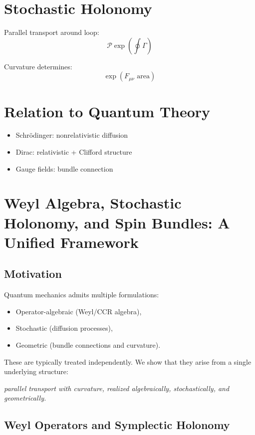 \documentclass[11pt]{article}
\begin{document}
\section{Stochastic Holonomy}

Parallel transport around loop:
\[
\mathcal{P} \exp\left( \oint \Gamma \right)
\]

Curvature determines:
\[
\exp(F_{\mu\nu} \text{ area})
\]

\section{Relation to Quantum Theory}

\begin{itemize}
\item Schr\"odinger: nonrelativistic diffusion
\item Dirac: relativistic + Clifford structure
\item Gauge fields: bundle connection
\end{itemize}


\section{Weyl Algebra, Stochastic Holonomy, and Spin Bundles: A Unified Framework}

\subsection{Motivation}

Quantum mechanics admits multiple formulations:
\begin{itemize}
\item Operator-algebraic (Weyl/CCR algebra),
\item Stochastic (diffusion processes),
\item Geometric (bundle connections and curvature).
\end{itemize}

These are typically treated independently. We show that they arise from a single underlying structure:
\begin{center}
\emph{parallel transport with curvature, realized algebraically, stochastically, and geometrically.}
\end{center}

\subsection{Weyl Operators and Symplectic Holonomy}
\end{document}
